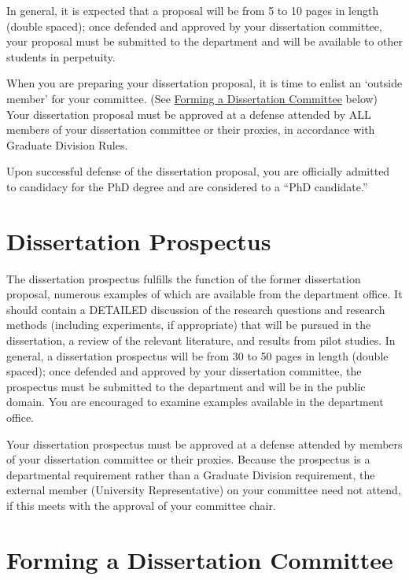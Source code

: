 \documentclass[
]{book}
\begin{document}
In general, it is expected that a proposal will be from 5 to 10 pages in length (double spaced); once defended and approved by your dissertation committee, your proposal must be submitted to the department and will be available to other students in perpetuity.

When you are preparing your dissertation proposal, it is time to enlist an `outside member' for your committee. (See \protect\hyperlink{forming-a-dissertation-committee}{Forming a Dissertation Committee} below) Your dissertation proposal must be approved at a defense attended by ALL members of your dissertation committee or their proxies, in accordance with Graduate Division Rules.

Upon successful defense of the dissertation proposal, you are officially admitted to candidacy for the PhD degree and are considered to a ``PhD candidate.''

\hypertarget{dissertation-prospectus}{%
\section{Dissertation Prospectus}\label{dissertation-prospectus}}

The dissertation prospectus fulfills the function of the former dissertation proposal, numerous examples of which are available from the department office. It should contain a DETAILED discussion of the research questions and research methods (including experiments, if appropriate) that will be pursued in the dissertation, a review of the relevant literature, and results from pilot studies. In general, a dissertation prospectus will be from 30 to 50 pages in length (double spaced); once defended and approved by your dissertation committee, the prospectus must be submitted to the department and will be in the public domain. You are encouraged to examine examples available in the department office.

Your dissertation prospectus must be approved at a defense attended by members of your dissertation committee or their proxies. Because the prospectus is a departmental requirement rather than a Graduate Division requirement, the external member (University Representative) on your committee need not attend, if this meets with the approval of your committee chair.

\hypertarget{forming-a-dissertation-committee}{%
\section{Forming a Dissertation Committee}\label{forming-a-dissertation-committee}}
\end{document}

